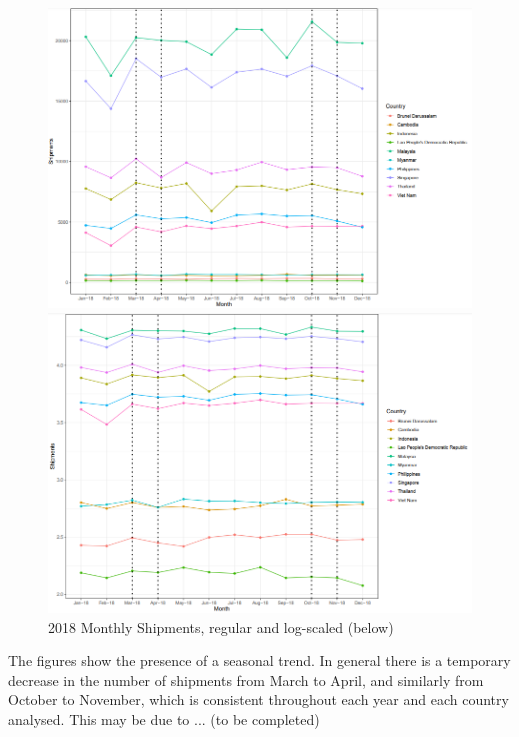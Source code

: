 \documentclass{article}
\begin{document}
\begin{figure}[H]
    \begin{minipage}[c]{1\linewidth}
        \includegraphics[width=\linewidth]{images/Line Plots/Seasonal/2018_seasonal_log.png}
    \end{minipage}
    \hfill
    \begin{minipage}[c]{1\linewidth}
        \includegraphics[width=\linewidth]{images/Line Plots/Seasonal/2018_seasonal.png}
        \caption{2018 Monthly Shipments, regular and log-scaled (below)}
    \end{minipage}
\end{figure}

\newpage

\noindent The figures show the presence of a seasonal trend. In general there is a temporary decrease in the number of shipments from March to April, and similarly from October to November, which is consistent throughout each year and each country analysed. This may be due to ... (to be completed)
\end{document}
